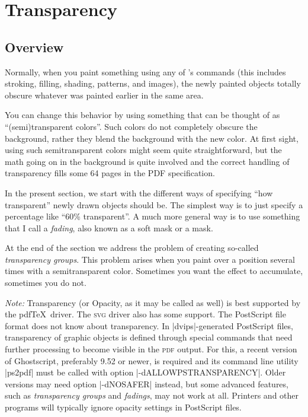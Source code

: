 %
%
%


\section{Transparency}
\label{section-tikz-transparency}

\subsection{Overview}

Normally, when you paint something using any of \tikzname's commands (this
includes stroking, filling, shading, patterns, and images), the newly painted
objects totally obscure whatever was painted earlier in the same area.

You can change this behavior by using something that can be thought of as
``(semi)transparent colors''. Such colors do not completely obscure the
background, rather they blend the background with the new color. At first
sight, using such semitransparent colors might seem quite straightforward, but
the math going on in the background is quite involved and the correct handling
of transparency fills some 64 pages in the PDF specification.

In the present section, we start with the different ways of specifying ``how
transparent'' newly drawn objects should be. The simplest way is to just
specify a percentage like ``60\% transparent''. A much more general way is to
use something that I call a \emph{fading}, also known as a soft mask or a mask.

At the end of the section we address the problem of creating so-called
\emph{transparency groups}. This problem arises when you paint over a position
several times with a semitransparent color. Sometimes you want the effect to
accumulate, sometimes you do not.

\emph{Note:} Transparency (or Opacity, as it may be called as well) is best
supported by the pdf\TeX\ driver. The \textsc{svg} driver also has some
support. The PostScript file format does not know about transparency. In
|dvips|-generated PostScript files, transparency of graphic objects is defined
through special commands that need further processing to become visible in the
\textsc{pdf} output. For this, a recent version of Ghostscript, preferably 9.52
or newer, is required and its command line utility |ps2pdf| must be called with
option |-dALLOWPSTRANSPARENCY|. Older versions may need option |-dNOSAFER|
instead, but some advanced features, such as \emph{transparency groups} and
\emph{fadings}, may not work at all. Printers and other programs will typically
ignore opacity settings in PostScript files.


